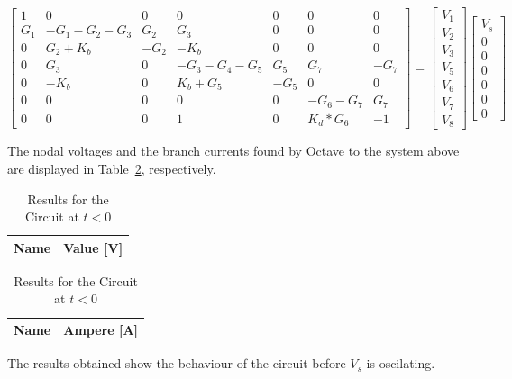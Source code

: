 $$
\begin{bmatrix}
  1 & 0 & 0 & 0 & 0 & 0 & 0 \\
  G_{1} & -G_{1}-G_{2}-G_{3} & G_{2} & G_{3} & 0 & 0 & 0 \\
  0 & G_{2}+K_{b} & -G_{2} & -K_{b} & 0 & 0 & 0 \\
  0 & G_{3} & 0 & -G_{3}-G_{4}-G_{5} & G_{5} & G_{7} & -G_{7} \\
  0 & -K_{b} & 0 & K_{b}+G_{5} & -G_{5} & 0 & 0 \\
  0 & 0 & 0 & 0 & 0 & -G_{6}-G_{7} & G_{7} \\
  0 & 0 & 0 & 1 & 0 & K_{d}*G_{6} & -1
\end{bmatrix}
=
\begin{bmatrix}
  V_{1}\\
  V_{2}\\
  V_{3}\\
  V_{5}\\
  V_{6}\\
  V_{7}\\
  V_{8}
\end{bmatrix}
\begin{bmatrix}
  V_{s}\\
  0\\
  0\\
  0\\
  0\\
  0\\
  0
\end{bmatrix}
$$

The nodal voltages and the branch currents found by Octave to the system above
are displayed in Table~\ref{tab:tb0}, respectively.\par

\begin{table}[htb!]
  \centering
  \begin{tabular}{|l|r|}
      \hline    
      {\bf Name} & {\bf Value [V]} \\ \hline
      
  \end{tabular}
\quad
  \begin{tabular}{|l|r|}
    \hline    
    {\bf Name} & {\bf Ampere [A]} \\ \hline
    
  \end{tabular}
  \caption{Results for the Circuit at $t<0$}
  \label{tab:tb0}
\end{table}

The results obtained show the behaviour of the circuit before $V_s$ is oscilating.

